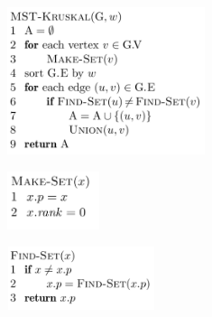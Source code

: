 \documentclass[12pt]{report}
\begin{document}
\vspace{\baselineskip}

\vspace{\baselineskip}
\begin{multicols}{2}



\begin{figure}[H]
	\begin{Center}
		\includegraphics[width=2.28in,height=1.7in]{./media/image118.png}
	\end{Center}
\end{figure}



\par




\begin{figure}[H]
	\begin{Center}
		\includegraphics[width=1.06in,height=0.67in]{./media/image119.png}
	\end{Center}
\end{figure}



\par




\begin{figure}[H]
	\begin{Center}
		\includegraphics[width=1.7in,height=0.73in]{./media/image120.png}
	\end{Center}
\end{figure}




\end{multicols}
\par
\end{document}

